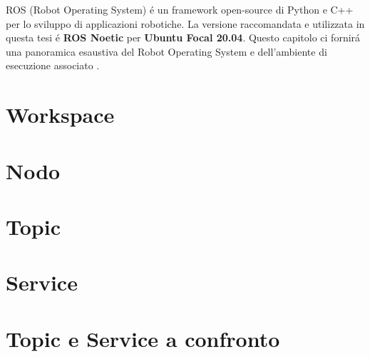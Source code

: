 ROS (Robot Operating System) \'{e} un framework open-source di Python e C++ per lo sviluppo di applicazioni robotiche.
La versione raccomandata e utilizzata in questa tesi \'{e} \textbf{ROS Noetic} per \textbf{Ubuntu Focal 20.04}.
Questo capitolo ci fornir\'{a} una panoramica esaustiva del Robot Operating System e dell'ambiente di esecuzione associato 
\cite{ros}.

\section{Workspace}


\section{Nodo}


\section{Topic}


\section{Service}


\section{Topic e Service a confronto}
